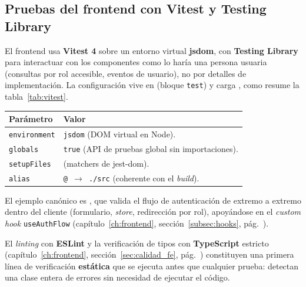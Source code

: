 \subsection{Pruebas del frontend con Vitest y Testing Library}
\label{subsec:vitest_vyv}

El frontend usa \textbf{Vitest 4} sobre un entorno virtual \textbf{jsdom}, con
\textbf{Testing Library} para interactuar con los componentes como lo haría una persona
usuaria (consultas por rol accesible, eventos de usuario), no por detalles de
implementación. La configuración vive en  (bloque \texttt{test})
y carga , como resume la tabla~\ref{tab:vitest}.

\vspace{0.2cm}
\noindent
\renewcommand{\arraystretch}{1.3}
\fontsize{8.5}{10.2}\selectfont\sffamily
\begin{tabularx}{\textwidth}{|L{3.4cm}|Y|}
\hline
{}
\sffamily\textbf{Parámetro} & \sffamily\textbf{Valor} \\
\hline
\texttt{environment} & \texttt{jsdom} (DOM virtual en Node). \\ \hline
{}
\texttt{globals} & \texttt{true} (API de pruebas global sin importaciones). \\ \hline
\texttt{setupFiles} &  (matchers de jest-dom). \\ \hline
{}
\texttt{alias} & \texttt{@ $\rightarrow$ ./src} (coherente con el \textit{build}). \\ \hline
\end{tabularx}
\label{tab:vitest}

El ejemplo canónico es , que valida el flujo de
autenticación de extremo a extremo dentro del cliente (formulario, \textit{store},
redirección por rol), apoyándose en el \textit{custom hook} \texttt{useAuthFlow}
(capítulo~\ref{ch:frontend}, sección~\ref{subsec:hooks}, pág.~\pageref{subsec:hooks}).

\begin{AvisoNota}
El \textit{linting} con \textbf{ESLint} y la verificación de tipos con \textbf{TypeScript}
estricto (capítulo~\ref{ch:frontend}, sección~\ref{sec:calidad_fe},
pág.~\pageref{sec:calidad_fe}) constituyen una primera línea de verificación
\textbf{estática} que se ejecuta antes que cualquier prueba: detectan una clase entera de
errores sin necesidad de ejecutar el código.
\end{AvisoNota}
